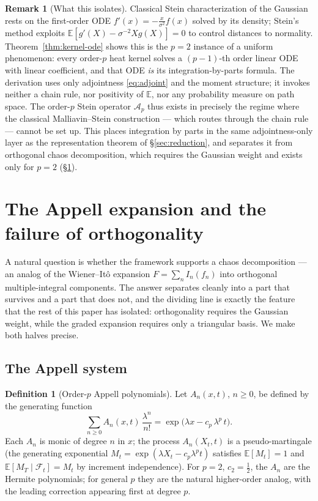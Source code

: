 \documentclass[11pt,reqno]{amsart}
\theoremstyle{plain}
\theoremstyle{definition}
\newtheorem{definition}[theorem]{Definition}
\newtheorem{remark}[theorem]{Remark}
\newcommand{\E}{\mathbb{E}}
\begin{document}
\begin{remark}[What this isolates]
Classical Stein characterization of the Gaussian rests on the first-order ODE $f'(x) = -\frac{x}{\sigma^2}f(x)$ solved by its density; Stein's method exploits $\E[g'(X) - \sigma^{-2}X g(X)] = 0$ to control distances to normality. Theorem~\ref{thm:kernel-ode} shows this is the $p=2$ instance of a uniform phenomenon: every order-$p$ heat kernel solves a $(p-1)$-th order linear ODE with linear coefficient, and that ODE \emph{is} its integration-by-parts formula. The derivation uses only adjointness \eqref{eq:adjoint} and the moment structure; it invokes neither a chain rule, nor positivity of $\E$, nor any probability measure on path space. The order-$p$ Stein operator $\mathcal{A}_p$ thus exists in precisely the regime where the classical Malliavin--Stein construction --- which routes through the chain rule --- cannot be set up. This places integration by parts in the same adjointness-only layer as the representation theorem of \S\ref{sec:reduction}, and separates it from orthogonal chaos decomposition, which requires the Gaussian weight and exists only for $p=2$ (\S\ref{sec:appell}).
\end{remark}

\section{The Appell expansion and the failure of orthogonality}
\label{sec:appell}

A natural question is whether the framework supports a chaos decomposition --- an analog of the Wiener--It\^o expansion $F = \sum_n I_n(f_n)$ into orthogonal multiple-integral components. The answer separates cleanly into a part that survives and a part that does not, and the dividing line is exactly the feature that the rest of this paper has isolated: orthogonality requires the Gaussian weight, while the graded expansion requires only a triangular basis. We make both halves precise.

\subsection{The Appell system}

\begin{definition}[Order-$p$ Appell polynomials]
\label{def:appell}
Let $A_n(x,t)$, $n \geq 0$, be defined by the generating function
\begin{equation}
\label{eq:appell-gen}
\sum_{n \geq 0} A_n(x,t)\,\frac{\lambda^n}{n!} = \exp\bigl(\lambda x - c_p\,\lambda^p\, t\bigr).
\end{equation}
Each $A_n$ is monic of degree $n$ in $x$; the process $A_n(X_t,t)$ is a pseudo-martingale (the generating exponential $M_t = \exp(\lambda X_t - c_p\lambda^p t)$ satisfies $\E[M_t] = 1$ and $\E[M_T \mid \mathcal F_t] = M_t$ by increment independence). For $p=2$, $c_2 = \tfrac12$, the $A_n$ are the Hermite polynomials; for general $p$ they are the natural higher-order analog, with the leading correction appearing first at degree $p$.
\end{definition}
\end{document}
